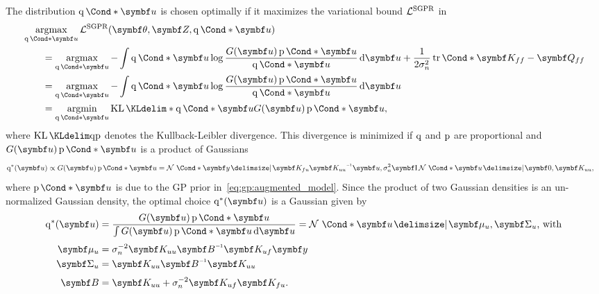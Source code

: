 The distribution $\Variat*{\mat{u}}$ is chosen optimally if it maximizes the variational bound $\mathcal{L}^{\text{SGPR}}$ in
\begin{equation}
    \begin{split}
        \MoveEqLeft\argmax_{\Variat*{\mat{u}}}\Lc^{\text{SGPR}}(\mat{\theta}, \mat{Z}, \Variat*{\mat{u}})                                                                                             \\
        & = \argmax_{\Variat*{\mat{u}}} -\int \Variat*{\mat{u}} \log\frac{G(\mat{u})\Prob*{\mat{u}}}{\Variat*{\mat{u}}} \diff \mat{u} + \frac{1}{2\sigma_n^2}\Fun*{\tr}{\mat{K_{ff}} - \mat{Q_{ff}}} \\
        & = \argmax_{\Variat*{\mat{u}}} -\int \Variat*{\mat{u}} \log\frac{G(\mat{u})\Prob*{\mat{u}}}{\Variat*{\mat{u}}} \diff \mat{u}                                                                \\
        & = \argmin_{\Variat*{\mat{u}}} \KL*{\Variat*{\mat{u}}}{G(\mat{u})\Prob*{\mat{u}}},
    \end{split}
\end{equation}
where $\KL{\q}{\p}$ denotes the Kullback-Leibler divergence.
This divergence is minimized if $\operatorname{q}$ and $\operatorname{p}$ are proportional and $G(\mat{u})\Prob*{\mat{u}}$ is a product of Gaussians
\begin{align}
    \q^\ast(\mat{u}) \propto G(\mat{u}) \Prob*{\mat{u}}
     & = \Gaussian*{\mat{y} \given \mat{K_{fu}} \mat{K_{uu}}\inv \mat{u}, \sigma_n^2\Eye}\Gaussian*{\mat{u} \given \mat{0}, \mat{K_{uu}}},
\end{align}
where $\Prob*{\mat{u}}$ is due to the GP prior in~\cref{eq:gp:augmented_model}.
Since the product of two Gaussian densities is an un-normalized Gaussian density, the optimal choice $\q^\ast(\mat{u})$ is a Gaussian given by
\begin{equation}
    \begin{split}
        \label{eq:gp:sgpr_optimal_q}
        \q^\ast(\mat{u})
        & = \frac{G(\mat{u}) \Prob*{\mat{u}}}{\int G(\mat{u}) \Prob*{\mat{u}} \diff \mat{u}}
        = \Gaussian*{\mat{u} \given \mat{\mu}_u, \mat{\Sigma}_u}\text{, with}                 \\[\smallskipamount]
        \mat{\mu}_u
        & = \sigma_n^{-2} \mat{K_{uu}}\mat{B}\inv \mat{K_{uf}}\mat{y}                        \\
        \mat{\Sigma}_u
        & = \mat{K_{uu}}\mat{B}\inv\mat{K_{uu}}                                              \\[\smallskipamount]
        \mat{B}
        & = \mat{K_{uu}} + \sigma_n^{-2} \mat{K_{uf}}\mat{K_{fu}}.
    \end{split}
\end{equation}
